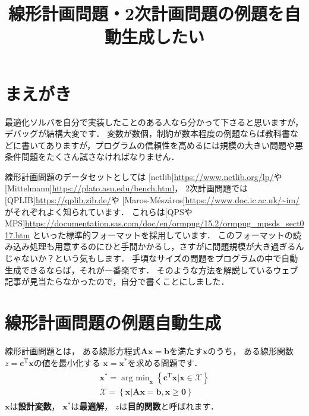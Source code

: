 ﻿\documentclass[a4paper]{jsarticle}
\title{線形計画問題・2次計画問題の例題を自動生成したい}
\begin{document}
\maketitle

\section{まえがき}

最適化ソルバを自分で実装したことのある人なら分かって下さると思いますが，デバッグが結構大変です．
変数が数個，制約が数本程度の例題ならば教科書などに書いてありますが，プログラムの信頼性を高めるには規模の大きい問題や悪条件問題をたくさん試さなければなりません．

線形計画問題のデータセットとしては
[netlib]\url{https://www.netlib.org/lp/}や
[Mittelmann]\url{https://plato.asu.edu/bench.html}，
2次計画問題では[QPLIB]\url{https://qplib.zib.de/}や
[Maros-Mészáros]\url{https://www.doc.ic.ac.uk/~im/}
がそれぞれよく知られています．
これらは[QPSやMPS]\url{https://documentation.sas.com/doc/en/ormpug/15.2/ormpug_mpsds_sect017.htm}
といった標準的フォーマットを採用しています．
このフォーマットの読み込み処理も用意するのにひと手間かかるし，さすがに問題規模が大き過ぎるんじゃないか？という気もします．
手頃なサイズの問題をプログラムの中で自動生成できるならば，それが一番楽です．
そのような方法を解説しているウェブ記事が見当たらなかったので，自分で書くことにしました．


\section{線形計画問題の例題自動生成}

線形計画問題とは，
ある線形方程式$\boldsymbol{A}\boldsymbol{x}=\boldsymbol{b}$を満たす$\boldsymbol{x}$のうち，
ある線形関数$z=\boldsymbol{c}^{\mathrm{T}}\boldsymbol{x}$の値を最小化する
$\boldsymbol{x}=\boldsymbol{x}^{*}$を求める問題です．
\begin{align}
\begin{array}{c}
\boldsymbol{x}^{*}=\mathop{\mathrm{arg~min}}_{\boldsymbol{x}}\left\{\boldsymbol{c}^{\mathrm{T}}\boldsymbol{x}
\left|\boldsymbol{x}\in\mathcal{X}\right.
\right\}
\\
\mathcal{X}=\left\{\boldsymbol{x}\left|
\boldsymbol{A}\boldsymbol{x}=\boldsymbol{b},
\boldsymbol{x}\geq\boldsymbol{0}
\right.
\right\}
\end{array}
\label{pb:lp}
\end{align}
$\boldsymbol{x}$は{\bf 設計変数}，
$\boldsymbol{x}^{*}$は{\bf 最適解}，
$z$は{\bf 目的関数}と呼ばれます．
\end{document}

